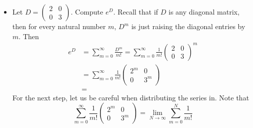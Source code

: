 \begin{eg}
   \begin{itemize}
       \item Let \( D = \begin{pmatrix} 2 & 0 \\ 0 & 3  \end{pmatrix}  \). Compute \( e^{D} \). Recall that if \( D \) is any diagonal matrix, then for every natural number \( m  \), \( D^{m}  \) is just raising the diagonal entries by \( m  \). Then 
           \begin{align*}
               e^{D} &= \sum_{ m= 0  }^{ \infty  } \frac{ D^{m} }{ m! }  = \sum_{ m = 0  }^{ \infty  } \frac{ 1 }{ m! }  \begin{pmatrix} 2 & 0 \\ 0 & 3  \end{pmatrix}^{m}   \\
                     &= \sum_{ m = 0  }^{ \infty  } \frac{ 1 }{ m! }  \begin{pmatrix} 2^{m} & 0 \\ 0 & 3^{m} \end{pmatrix}  \\
                     &=
           \end{align*}
           For the next step, let us be careful when distributing the series in. Note that 
           \[  \sum_{ m = 0  }^{ \infty  } \frac{ 1 }{ m!  }  \begin{pmatrix} 2^{m} & 0 \\ 0 & 3^{m} \end{pmatrix}  = \lim_{ N \to \infty  }  \sum_{ m = 0  }^{ N  } \frac{ 1 }{ m! }   \]

   \end{itemize} 
\end{eg}


